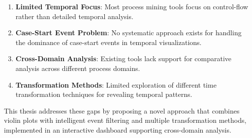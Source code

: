 \begin{enumerate}
    \item \textbf{Limited Temporal Focus}: Most process mining tools focus on control-flow rather than detailed temporal analysis.
    
    \item \textbf{Case-Start Event Problem}: No systematic approach exists for handling the dominance of case-start events in temporal visualizations.
    
    \item \textbf{Cross-Domain Analysis}: Existing tools lack support for comparative analysis across different process domains.
    
    \item \textbf{Transformation Methods}: Limited exploration of different time transformation techniques for revealing temporal patterns.
\end{enumerate}

This thesis addresses these gaps by proposing a novel approach that combines violin plots with intelligent event filtering and multiple transformation methods, implemented in an interactive dashboard supporting cross-domain analysis.
